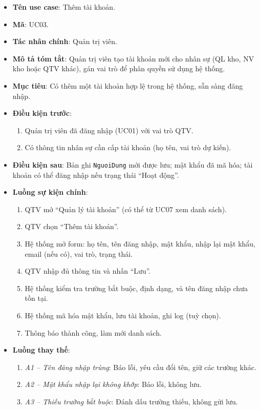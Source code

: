 \begin{itemize}[leftmargin=1.5cm]
    \item \textbf{Tên use case}: Thêm tài khoản.
    \item \textbf{Mã}: UC03.
    \item \textbf{Tác nhân chính}: Quản trị viên.
    \item \textbf{Mô tả tóm tắt}: Quản trị viên tạo tài khoản mới cho nhân sự (QL kho, NV kho hoặc QTV khác), gán vai trò để phân quyền sử dụng hệ thống.
    \item \textbf{Mục tiêu}: Có thêm một tài khoản hợp lệ trong hệ thống, sẵn sàng đăng nhập.
    \item \textbf{Điều kiện trước}:
    \begin{enumerate}
        \item Quản trị viên đã đăng nhập (UC01) với vai trò QTV.
        \item Có thông tin nhân sự cần cấp tài khoản (họ tên, vai trò dự kiến).
    \end{enumerate}
    \item \textbf{Điều kiện sau}: Bản ghi \texttt{NguoiDung} mới được lưu; mật khẩu đã mã hóa; tài khoản có thể đăng nhập nếu trạng thái ``Hoạt động''.
    \item \textbf{Luồng sự kiện chính}:
    \begin{enumerate}
        \item QTV mở ``Quản lý tài khoản'' (có thể từ UC07 xem danh sách).
        \item QTV chọn ``Thêm tài khoản''.
        \item Hệ thống mở form: họ tên, tên đăng nhập, mật khẩu, nhập lại mật khẩu, email (nếu có), vai trò, trạng thái.
        \item QTV nhập đủ thông tin và nhấn ``Lưu''.
        \item Hệ thống kiểm tra trường bắt buộc, định dạng, và tên đăng nhập chưa tồn tại.
        \item Hệ thống mã hóa mật khẩu, lưu tài khoản, ghi log (tuỳ chọn).
        \item Thông báo thành công, làm mới danh sách.
    \end{enumerate}
    \item \textbf{Luồng thay thế}:
    \begin{enumerate}
        \item \textit{A1 -- Tên đăng nhập trùng}: Báo lỗi, yêu cầu đổi tên, giữ các trường khác.
        \item \textit{A2 -- Mật khẩu nhập lại không khớp}: Báo lỗi, không lưu.
        \item \textit{A3 -- Thiếu trường bắt buộc}: Đánh dấu trường thiếu, không gửi lưu.
    \end{enumerate}
\end{itemize}

